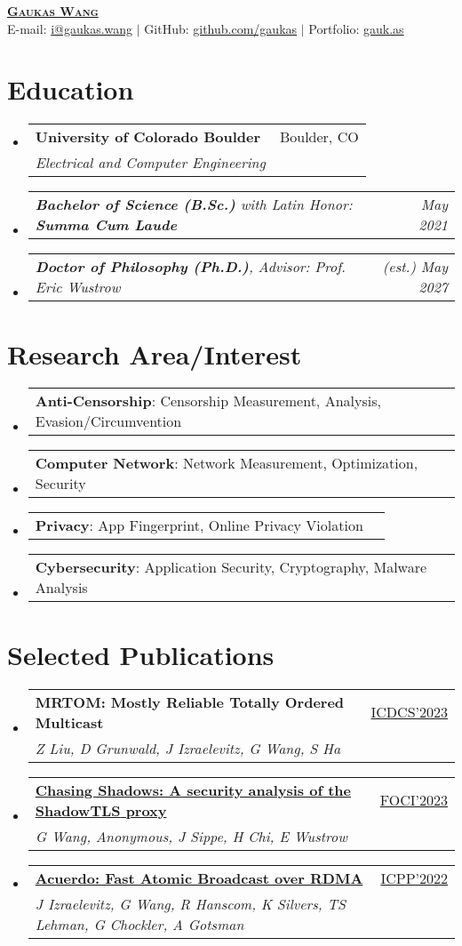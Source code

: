 \documentclass[letterpaper,11pt]{article}
\makeatletter
\newcommand{\resumeSubheading}[4]{
  \vspace{-2pt}\item
    \begin{tabular*}{0.97\textwidth}[t]{l@{\extracolsep{\fill}}r}
      \textbf{#1} & #2 \\
      \textit{\small#3} & \textit{\small #4} \\
    \end{tabular*}\vspace{-7pt}
}
\newcommand{\resumeSubSubheading}[2]{
    \item
    \begin{tabular*}{0.97\textwidth}{l@{\extracolsep{\fill}}r}
      \textit{\small#1} & \textit{\small #2} \\
    \end{tabular*}\vspace{-7pt}
}
\newcommand{\resumeProjectHeading}[2]{
    \item
    \begin{tabular*}{0.97\textwidth}{l@{\extracolsep{\fill}}r}
      \small#1 & #2 \\
    \end{tabular*}\vspace{-7pt}
}
\newcommand{\resumeSubHeadingListStart}{\begin{itemize}[leftmargin=0.15in, label={}]}
\newcommand{\resumeSubHeadingListEnd}{\end{itemize}}
\makeatother
\begin{document}
\begin{center}
  \href{https://gaukas.wang}{\textbf{\Huge \scshape Gaukas Wang}} \\ \vspace{1pt}
    E-mail: \href{mailto:i@gaukas.wang}{{i@gaukas.wang}} $|$ 
    GitHub: \href{https://github.com/gaukas}{{github.com/gaukas}} $|$ 
    Portfolio: \href{https://gauk.as}{gauk.as}
\end{center}


\section{Education}
\resumeSubHeadingListStart
\resumeSubheading
{University of Colorado Boulder}{Boulder, CO}
{Electrical and Computer Engineering}{}
\resumeSubSubheading
{\textbf{Bachelor of Science (B.Sc.)} \em{with Latin Honor: \textbf{Summa Cum Laude}}}{May 2021}
\resumeSubSubheading
{\textbf{Doctor of Philosophy (Ph.D.)}, {Advisor: Prof. Eric Wustrow}}{\textit{(est.)} May 2027}
\resumeSubHeadingListEnd

\vspace{1pt}

\section{Research Area/Interest}
\resumeSubHeadingListStart

\resumeProjectHeading
{\textbf{Anti-Censorship}: Censorship Measurement, Analysis, Evasion/Circumvention}{}

\resumeProjectHeading
{\textbf{Computer Network}: Network Measurement, Optimization, Security}{}

\resumeProjectHeading
{\textbf{Privacy}: App Fingerprint, Online Privacy Violation}{}

\resumeProjectHeading
{\textbf{Cybersecurity}: Application Security, Cryptography, Malware Analysis}{}

\resumeSubHeadingListEnd
\vspace{1pt}

\section{Selected Publications}
\resumeSubHeadingListStart
  \resumeSubheading
  {\textbf{{MRTOM}: Mostly Reliable Totally Ordered Multicast}}{\href{https://icdcs2023.icdcs.org/}{ICDCS'2023}}
  {Z Liu, D Grunwald, J Izraelevitz, G Wang, S Ha}{}
  \resumeSubheading
  {\href{https://www.petsymposium.org/foci/2023/foci-2023-0002.php}{\textbf{{Chasing Shadows}: A security analysis of the {ShadowTLS} proxy}}}{\href{https://foci.community/foci23.html}{FOCI'2023}}
  {G Wang, Anonymous, J Sippe, H Chi, E Wustrow}{}
  \resumeSubheading
  {\href{https://dl.acm.org/doi/abs/10.1145/3545008.3545041}{\textbf{Acuerdo: Fast Atomic Broadcast over {RDMA}}}}{\href{https://icpp22.gitlabpages.inria.fr/}{ICPP'2022}}
  {J Izraelevitz, G Wang, R Hanscom, K Silvers, TS Lehman, G Chockler, A Gotsman}{}
\resumeSubHeadingListEnd
\vspace{1pt}
\end{document}
